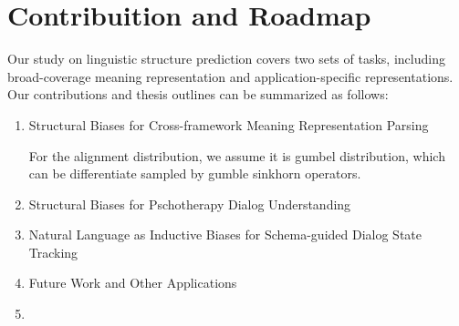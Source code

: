 \section{Contribuition and Roadmap}
\label{sec:intro-contri}

Our study on linguistic structure prediction covers two sets of tasks,
including broad-coverage meaning representation and
application-specific representations. Our contributions and thesis
outlines can be summarized as follows:

\begin{enumerate}
\item Structural Biases for Cross-framework Meaning Representation Parsing

  For the alignment distribution, we assume it is gumbel distribution, which can be differentiate sampled by gumble sinkhorn operators.


\item Structural Biases for Pschotherapy Dialog Understanding

\item Natural Language as Inductive Biases for Schema-guided Dialog State Tracking

\item Future Work and Other Applications
\item \end{enumerate}

